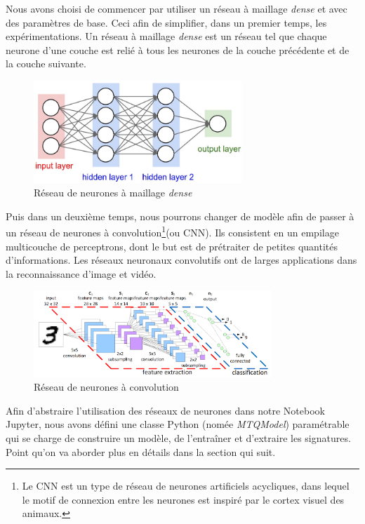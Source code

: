 \documentclass[oneside,13pt,a4paper]{report}
\begin{document}
Nous avons choisi de commencer par utiliser un réseau à maillage \textit{dense} et avec des paramètres de base. Ceci afin de simplifier, dans un premier temps, les expérimentations. Un réseau à maillage \textit{dense} est un réseau tel que chaque neurone d'une couche est relié à tous les neurones de la couche précédente et de la couche suivante.

\begin{figure}[!h]
	\center
	\includegraphics[width=0.7\textwidth]{img/ann-dense.jpg}
	\caption{Réseau de neurones à maillage \textit{dense}}
	\label{dense}
\end{figure}


Puis dans un deuxième temps, nous pourrons changer de modèle afin de passer à un réseau de neurones à convolution\footnote{Le CNN est un type de réseau de neurones artificiels acycliques, dans lequel le motif de connexion entre les neurones est inspiré par le cortex visuel des animaux.}(ou CNN). Ils consistent en un empilage multicouche de perceptrons, dont le but est de prétraiter de petites quantités d'informations. Les réseaux neuronaux convolutifs ont de larges applications dans la reconnaissance d'image et vidéo.

\begin{figure}[!h]
	\center
	\includegraphics[width=0.8\textwidth]{img/cnn.png}
	\caption{Réseau de neurones à convolution}
\end{figure}

Afin d'abstraire l'utilisation des réseaux de neurones dans notre Notebook Jupyter, nous avons défini une classe Python (nomée \textit{MTQModel}) paramétrable qui se charge de construire un modèle, de l'entraîner et d'extraire les signatures. Point qu'on va aborder plus en détails dans la section qui suit.
\end{document}
